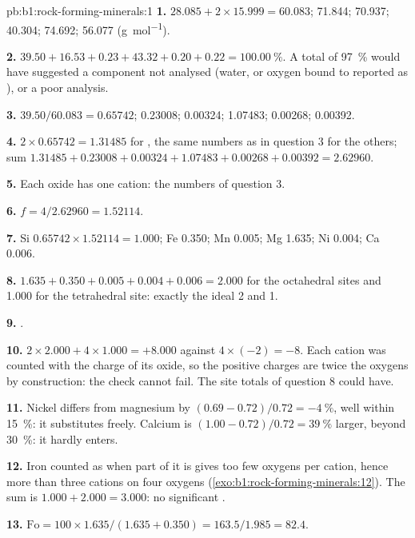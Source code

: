 \begin{solution}{pb:b1:rock-forming-minerals:1}
\textbf{1.}  $28.085 + 2\times15.999 = 60.083$;  71.844;
 70.937;  40.304;  74.692;  56.077
(\si{g.mol^{-1}}).

\textbf{2.} $39.50 + 16.53 + 0.23 + 43.32 + 0.20 + 0.22 =
\qty{100.00}{\percent}$. A total of \qty{97}{\percent} would have suggested a
component not analysed (water, or oxygen bound to  reported as
), or a poor analysis.

\textbf{3.}  $39.50/60.083 = 0.65742$;  0.23008; 
0.00324;  1.07483;  0.00268;  0.00392.

\textbf{4.} $2\times0.65742 = 1.31485$ for , the same numbers as in
question 3 for the others; sum $1.31485 + 0.23008 + 0.00324 + 1.07483 +
0.00268 + 0.00392 = 2.62960$.

\textbf{5.} Each oxide has one cation: the numbers of question 3.

\textbf{6.} $f = 4/2.62960 = 1.52114$.

\textbf{7.} Si $0.65742\times1.52114 = 1.000$; Fe 0.350; Mn 0.005; Mg 1.635;
Ni 0.004; Ca 0.006.

\textbf{8.} $1.635 + 0.350 + 0.005 + 0.004 + 0.006 = 2.000$ for the
octahedral sites and 1.000 for the tetrahedral site: exactly the ideal 2 and
1.

\textbf{9.} .

\textbf{10.} $2\times2.000 + 4\times1.000 = +8.000$ against $4\times(-2) =
-8$. Each cation was counted with the charge of its oxide, so the positive
charges are twice the oxygens by construction: the check cannot fail. The
site totals of question 8 could have.

\textbf{11.} Nickel differs from magnesium by
$(0.69 - 0.72)/0.72 = -\qty{4}{\percent}$, well within \qty{15}{\percent}:
it substitutes freely. Calcium is $(1.00 - 0.72)/0.72 = \qty{39}{\percent}$
larger, beyond \qty{30}{\percent}: it hardly enters.

\textbf{12.} Iron counted as  when part of it is  gives
too few oxygens per cation, hence more than three cations on four oxygens
(\cref{exo:b1:rock-forming-minerals:12}). The sum is $1.000 + 2.000 = 3.000$: no significant
.

\textbf{13.} $\mathrm{Fo} = 100\times1.635/(1.635 + 0.350) = 163.5/1.985 =
82.4$.


\end{solution}
